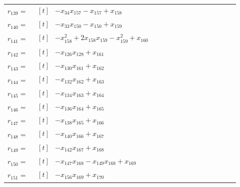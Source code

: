 \begin{longtable}{@{}r p{0.92\linewidth}@{}}
$r_{139}=$ & $\begin{aligned}[t]&-x_{34}x_{157}-x_{157}+x_{158}\end{aligned}$ \\[2pt]
$r_{140}=$ & $\begin{aligned}[t]&-x_{33}x_{150}-x_{150}+x_{159}\end{aligned}$ \\[2pt]
$r_{141}=$ & $\begin{aligned}[t]&-x_{158}^{2}+2x_{158}x_{159}-x_{159}^{2}+x_{160}\end{aligned}$ \\[2pt]
$r_{142}=$ & $\begin{aligned}[t]&-x_{126}x_{128}+x_{161}\end{aligned}$ \\[2pt]
$r_{143}=$ & $\begin{aligned}[t]&-x_{130}x_{161}+x_{162}\end{aligned}$ \\[2pt]
$r_{144}=$ & $\begin{aligned}[t]&-x_{132}x_{162}+x_{163}\end{aligned}$ \\[2pt]
$r_{145}=$ & $\begin{aligned}[t]&-x_{134}x_{163}+x_{164}\end{aligned}$ \\[2pt]
$r_{146}=$ & $\begin{aligned}[t]&-x_{136}x_{164}+x_{165}\end{aligned}$ \\[2pt]
$r_{147}=$ & $\begin{aligned}[t]&-x_{138}x_{165}+x_{166}\end{aligned}$ \\[2pt]
$r_{148}=$ & $\begin{aligned}[t]&-x_{140}x_{166}+x_{167}\end{aligned}$ \\[2pt]
$r_{149}=$ & $\begin{aligned}[t]&-x_{142}x_{167}+x_{168}\end{aligned}$ \\[2pt]
$r_{150}=$ & $\begin{aligned}[t]&-x_{147}x_{168}-x_{149}x_{168}+x_{169}\end{aligned}$ \\[2pt]
$r_{151}=$ & $\begin{aligned}[t]&-x_{156}x_{169}+x_{170}\end{aligned}$ \\[2pt]

\end{longtable}
